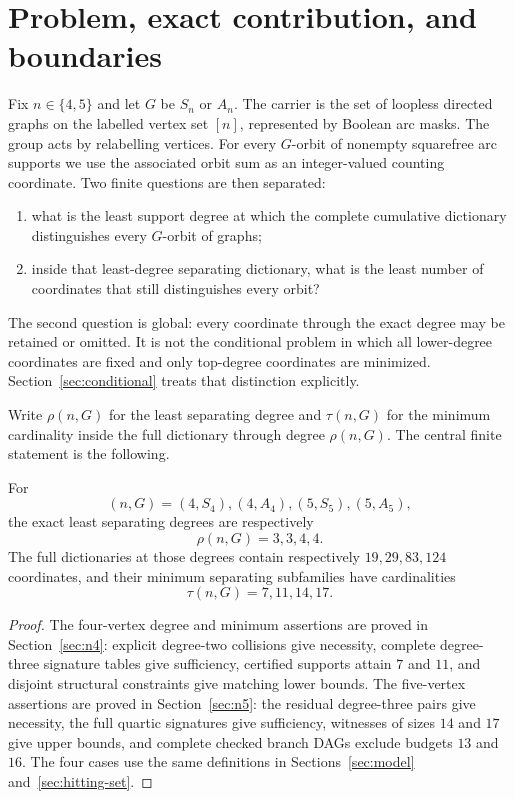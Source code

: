 \section{Problem, exact contribution, and boundaries}
\label{sec:problem}

Fix $n\in\{4,5\}$ and let $G$ be $S_n$ or $A_n$.  The carrier is the set of
loopless directed graphs on the labelled vertex set $[n]$, represented by
Boolean arc masks.  The group acts by relabelling vertices.  For every
$G$-orbit of nonempty squarefree arc supports we use the associated orbit sum
as an integer-valued counting coordinate.  Two finite questions are then
separated:
\begin{enumerate}
  \item what is the least support degree at which the complete cumulative
  dictionary distinguishes every $G$-orbit of graphs;
  \item inside that least-degree separating dictionary, what is the least number of
  coordinates that still distinguishes every orbit?
\end{enumerate}

The second question is global: every coordinate through the exact degree may
be retained or omitted.  It is not the conditional problem in which all
lower-degree coordinates are fixed and only top-degree coordinates are
minimized.  Section~\ref{sec:conditional} treats that distinction explicitly.

Write $\rho(n,G)$ for the least separating degree and $\tau(n,G)$ for the
minimum cardinality inside the full dictionary through degree $\rho(n,G)$.
The central finite statement is the following.

\begin{theorem}
\label{thm:unified}
For
\[
 (n,G)=(4,S_4),(4,A_4),(5,S_5),(5,A_5),
\]
the exact least separating degrees are respectively
\[
  \rho(n,G)=3,3,4,4.
\]
The full dictionaries at those degrees contain respectively
$19,29,83,124$ coordinates, and their minimum separating subfamilies have
cardinalities
\[
  \tau(n,G)=7,11,14,17.
\]
\end{theorem}

\begin{proof}
The four-vertex degree and minimum assertions are proved in
Section~\ref{sec:n4}: explicit degree-two collisions give necessity, complete
degree-three signature tables give sufficiency, certified supports attain
$7$ and $11$, and disjoint structural constraints give matching lower bounds.
The five-vertex assertions are proved in Section~\ref{sec:n5}: the residual
degree-three pairs give necessity, the full quartic signatures give
sufficiency, witnesses of sizes $14$ and $17$ give upper bounds, and complete
checked branch DAGs exclude budgets $13$ and $16$.  The four cases use the
same definitions in Sections~\ref{sec:model} and~\ref{sec:hitting-set}.
\end{proof}

